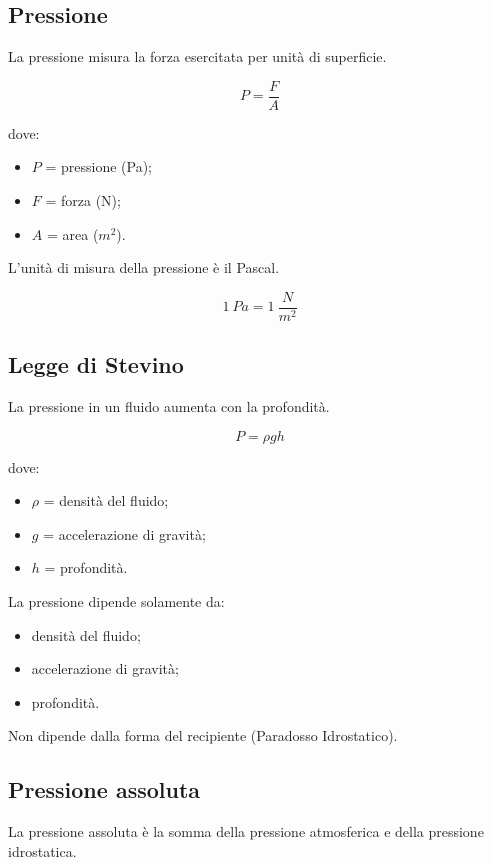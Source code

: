 \subsection{Pressione}

La pressione misura la forza esercitata per unità di superficie.

\[
P=\frac{F}{A}
\]

\noindent dove:

\begin{itemize}
    \item $P$ = pressione (Pa);
    \item $F$ = forza (N);
    \item $A$ = area ($m^2$).
\end{itemize}

\noindent L'unità di misura della pressione è il Pascal.

\[
1\ Pa=1\ \frac{N}{m^2}
\]

\subsection{Legge di Stevino}

La pressione in un fluido aumenta con la profondità.

\[
P=\rho gh
\]

\noindent dove:

\begin{itemize}
    \item $\rho$ = densità del fluido;
    \item $g$ = accelerazione di gravità;
    \item $h$ = profondità.
\end{itemize}

\noindent La pressione dipende solamente da:

\begin{itemize}
    \item densità del fluido;
    \item accelerazione di gravità;
    \item profondità.
\end{itemize}

\noindent Non dipende dalla forma del recipiente (Paradosso Idrostatico).

\subsection{Pressione assoluta}

La pressione assoluta è la somma della pressione atmosferica e della pressione idrostatica.

